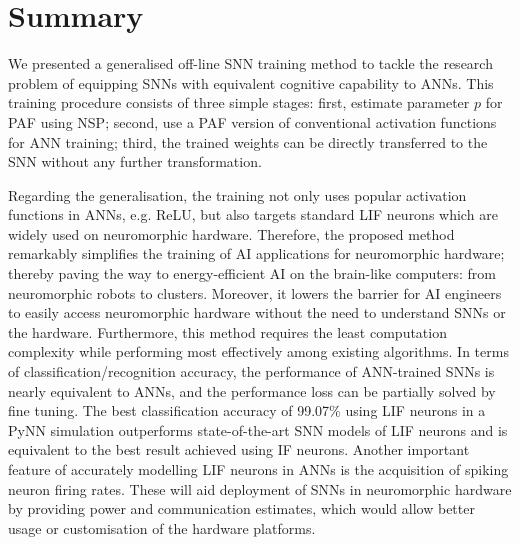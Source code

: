 \section{Summary}
	We presented a generalised off-line SNN training method to tackle the research problem of equipping SNNs with equivalent cognitive capability to ANNs.
	This training procedure consists of three simple stages: first, estimate parameter $p$ for PAF using NSP; second, use a PAF version of conventional activation functions for ANN training; %
	third, the trained weights can be directly transferred to the SNN without any further transformation.
	
	
	
	Regarding the generalisation, the training not only uses popular activation functions in ANNs, e.g. ReLU, but also targets standard LIF neurons which are widely used on neuromorphic hardware.
	Therefore, the proposed method remarkably simplifies the training of AI applications for neuromorphic hardware;
	thereby paving the way to energy-efficient AI on the brain-like computers: from neuromorphic robots to clusters.
	Moreover, it lowers the barrier for AI engineers to easily access neuromorphic hardware without the need to understand SNNs or the hardware.
	Furthermore, this method requires the least computation complexity while performing most effectively among existing algorithms.
	In terms of classification/recognition accuracy, the performance of ANN-trained SNNs is nearly equivalent to ANNs, and the performance loss can be partially solved by fine tuning.
	The best classification accuracy of 99.07\% using LIF neurons in a PyNN simulation outperforms state-of-the-art SNN models of LIF neurons and is equivalent to the best result achieved using IF neurons.
	Another important feature of accurately modelling LIF neurons in ANNs is the acquisition of spiking neuron firing rates. These will aid deployment of SNNs in neuromorphic hardware by providing power and communication estimates, which would allow better usage or customisation of the hardware platforms.
